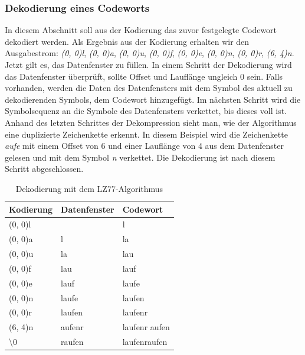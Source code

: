 \subsubsection{Dekodierung eines Codeworts}
\label{subsubsec:dekodierung_codewort}
In diesem Abschnitt soll aus der Kodierung das zuvor festgelegte Codewort dekodiert werden.
Als Ergebnis aus der Kodierung erhalten wir den Ausgabestrom: \newline
 \textit{(0, 0)l}, \textit{(0, 0)a}, \textit{(0, 0)u}, \textit{(0, 0)f}, \textit{(0, 0)e}, \textit{(0, 0)n}, \textit{(0, 0)r}, \textit{(6, 4)n}. \newline
Jetzt gilt es, das Datenfenster zu füllen.
In einem Schritt der Dekodierung wird das Datenfenster überprüft, sollte Offset und Lauflänge ungleich 0 sein.
Falls vorhanden, werden die Daten des Datenfensters mit dem Symbol des aktuell zu dekodierenden Symbols, dem Codewort hinzugefügt.
Im nächsten Schritt wird die Symbolsequenz an die Symbole des Datenfensters verkettet, bis dieses voll ist.
Anhand des letzten Schrittes der Dekompression sieht man, wie der Algorithmus eine duplizierte Zeichenkette erkennt.
In diesem Beispiel wird die Zeichenkette \textit{aufe} mit einem Offset von 6 und einer Lauflänge von 4 aus dem Datenfenster gelesen und mit dem Symbol \textit{n} verkettet.
Die Dekodierung ist nach diesem Schritt abgeschlossen.
\newline
\begin{table}[H]
\centering
\begin{tabular}{|l|l|l|}
\hline
\textbf{Kodierung} & \textbf{Datenfenster}         & \textbf{Codewort} \\ \hline
(0, 0)l            &                               & l                 \\ \hline
(0, 0)a            & l                             & la                \\ \hline
(0, 0)u            & la                            & lau               \\ \hline
(0, 0)f            & lau                           & lauf              \\ \hline
(0, 0)e            & lauf                          & laufe             \\ \hline
(0, 0)n            & laufe                         & laufen            \\ \hline
(0, 0)r            & laufen                        & laufenr           \\ \hline
{\color[HTML]{009901}(6, 4)n}            & {\color[HTML]{009901} aufe}nr & laufenr{\color[HTML]{009901} aufen}      \\ \hline
\textbackslash 0   & raufen 					   & laufenraufen 		\\ \hline
\end{tabular}
\label{tab:lz77_decode_table}
\caption{Dekodierung mit dem LZ77-Algorithmus}
\end{table}

